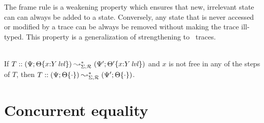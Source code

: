 The frame rule is a weakening property which ensures that new,
irrelevant state can can always be added to a state. Conversely, any
state that is never accessed or modified by a trace can be always be 
removed without making the trace ill-typed. This property
is a generalization of strengthening to \sls~traces.

\bigskip
\begin{theorem}\label{thm:framestrong}~\\
  If $T :: (\Psi; {\Theta}\{{x{:}{Y}\,{{\it lvl}}}\}) \leadsto^*_{\Sigma,
    \mathcal R} (\Psi'; {\Theta'}\{{x{:}{Y}\,{{\it lvl}}}\})$ and $x$ is not
  free in any of the steps of $T$, then $T :: (\Psi;
  {\Theta}\{{\cdot}\}) \leadsto^*_{\Sigma, \mathcal R} (\Psi';
  {\Theta}\{{\cdot}\})$.
\end{theorem}

\section{Concurrent equality}
\label{sec:linconcurrenteq}
\label{sec:framework-concurrenteq}

